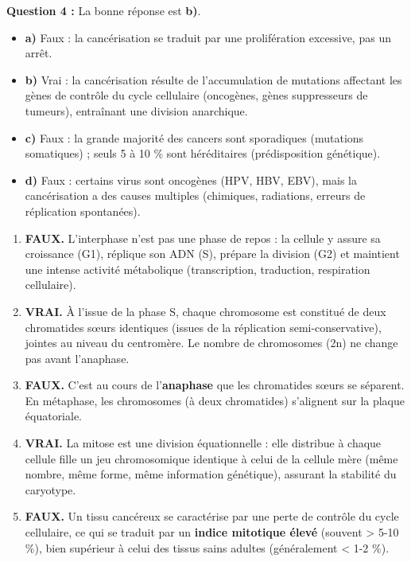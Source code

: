 \documentclass[11pt]{article}
\begin{document}
\begin{corrige}
\textbf{Question 4 :} La bonne réponse est \textbf{b)}.
\begin{itemize}
\item \textbf{a)} Faux : la cancérisation se traduit par une prolifération excessive, pas un arrêt.
\item \textbf{b)} Vrai : la cancérisation résulte de l'accumulation de mutations affectant les gènes de contrôle du cycle cellulaire (oncogènes, gènes suppresseurs de tumeurs), entraînant une division anarchique.
\item \textbf{c)} Faux : la grande majorité des cancers sont sporadiques (mutations somatiques) ; seuls 5 à 10 \% sont héréditaires (prédisposition génétique).
\item \textbf{d)} Faux : certains virus sont oncogènes (HPV, HBV, EBV), mais la cancérisation a des causes multiples (chimiques, radiations, erreurs de réplication spontanées).
\end{itemize}
\end{corrige}

\begin{corrige}
\begin{enumerate}
\item \textbf{FAUX.} L'interphase n'est pas une phase de repos : la cellule y assure sa croissance (G1), réplique son ADN (S), prépare la division (G2) et maintient une intense activité métabolique (transcription, traduction, respiration cellulaire).
\item \textbf{VRAI.} À l'issue de la phase S, chaque chromosome est constitué de deux chromatides sœurs identiques (issues de la réplication semi-conservative), jointes au niveau du centromère. Le nombre de chromosomes (2n) ne change pas avant l'anaphase.
\item \textbf{FAUX.} C'est au cours de l'\textbf{anaphase} que les chromatides sœurs se séparent. En métaphase, les chromosomes (à deux chromatides) s'alignent sur la plaque équatoriale.
\item \textbf{VRAI.} La mitose est une division équationnelle : elle distribue à chaque cellule fille un jeu chromosomique identique à celui de la cellule mère (même nombre, même forme, même information génétique), assurant la stabilité du caryotype.
\item \textbf{FAUX.} Un tissu cancéreux se caractérise par une perte de contrôle du cycle cellulaire, ce qui se traduit par un \textbf{indice mitotique élevé} (souvent > 5-10 \%), bien supérieur à celui des tissus sains adultes (généralement < 1-2 \%).
\end{enumerate}
\end{corrige}
\end{document}
